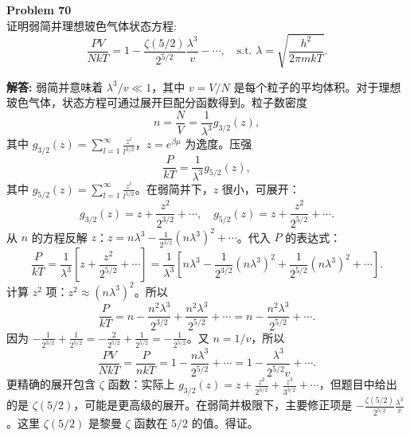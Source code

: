 \documentclass[12pt, a4paper, oneside]{ctexart}
\newenvironment{solution}{\par\noindent\textbf{解答:}\quad}{\par}
\begin{document}
\begin{mdframed}[backgroundcolor=gray!10, linewidth=0pt]
    \textbf{Problem 70} \\
    证明弱简并理想玻色气体状态方程:
    \[
    \frac{P V}{N k T} = 1 - \frac{\zeta(5/2)}{2^{5/2}} \frac{\lambda^3}{v} - \cdots, \quad \text{s.t. } \lambda = \sqrt{\frac{h^2}{2\pi m k T}}.
    \]
\end{mdframed}
\begin{solution}
    弱简并意味着 $\lambda^3 / v \ll 1$，其中 $v = V/N$ 是每个粒子的平均体积。对于理想玻色气体，状态方程可通过展开巨配分函数得到。粒子数密度
    \[
    n = \frac{N}{V} = \frac{1}{\lambda^3} g_{3/2}(z),
    \]
    其中 $g_{3/2}(z) = \sum_{l=1}^\infty \frac{z^l}{l^{3/2}}$，$z = e^{\beta \mu}$ 为逸度。压强
    \[
    \frac{P}{kT} = \frac{1}{\lambda^3} g_{5/2}(z),
    \]
    其中 $g_{5/2}(z) = \sum_{l=1}^\infty \frac{z^l}{l^{5/2}}$。在弱简并下，$z$ 很小，可展开：
    \[
    g_{3/2}(z) = z + \frac{z^2}{2^{3/2}} + \cdots, \quad g_{5/2}(z) = z + \frac{z^2}{2^{5/2}} + \cdots.
    \]
    从 $n$ 的方程反解 $z$：$z = n \lambda^3 - \frac{1}{2^{3/2}} (n \lambda^3)^2 + \cdots$。代入 $P$ 的表达式：
    \[
    \frac{P}{kT} = \frac{1}{\lambda^3} \left[ z + \frac{z^2}{2^{5/2}} + \cdots \right] = \frac{1}{\lambda^3} \left[ n \lambda^3 - \frac{1}{2^{3/2}} (n \lambda^3)^2 + \frac{1}{2^{5/2}} (n \lambda^3)^2 + \cdots \right].
    \]
    计算 $z^2$ 项：$z^2 \approx (n \lambda^3)^2$。所以
    \[
    \frac{P}{kT} = n - \frac{n^2 \lambda^3}{2^{3/2}} + \frac{n^2 \lambda^3}{2^{5/2}} + \cdots = n - \frac{n^2 \lambda^3}{2^{5/2}} + \cdots.
    \]
    因为 $-\frac{1}{2^{3/2}} + \frac{1}{2^{5/2}} = -\frac{2}{2^{5/2}} + \frac{1}{2^{5/2}} = -\frac{1}{2^{5/2}}$。又 $n = 1/v$，所以
    \[
    \frac{P V}{N k T} = \frac{P}{n k T} = 1 - \frac{n \lambda^3}{2^{5/2}} + \cdots = 1 - \frac{\lambda^3}{2^{5/2} v} + \cdots.
    \]
    更精确的展开包含 $\zeta$ 函数：实际上 $g_{3/2}(z) = z + \frac{z^2}{2^{3/2}} + \frac{z^3}{3^{3/2}} + \cdots$，但题目中给出的是 $\zeta(5/2)$，可能是更高级的展开。在弱简并极限下，主要修正项是 $- \frac{\zeta(5/2)}{2^{5/2}} \frac{\lambda^3}{v}$。这里 $\zeta(5/2)$ 是黎曼 $\zeta$ 函数在 $5/2$ 的值。得证。
\end{solution}
\end{document}

